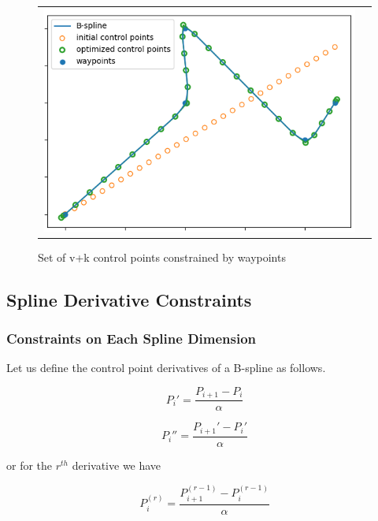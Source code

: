 \documentclass{article}
\begin{document}
\begin{figure}[h]
\begin{tabular}{ll}
\includegraphics[scale=.6]{WaypointConstraintsVariableResolution.png}
\end{tabular}
\caption{Set of v+k control points constrained by waypoints}
\label{Fig:WaypointConstraintsVariableResolution}
\end{figure}

\subsection{Spline Derivative Constraints}

\subsubsection{Constraints on Each Spline Dimension}

Let us define the control point derivatives of a B-spline as follows.

\begin{equation}
    P_i' = \frac{P_{i+1} - P_{i}}{\alpha}
\end{equation}

\begin{equation}
   P_i''= \frac{P_{i+1}' - P_{i}'}{\alpha}
\end{equation}

or for the \(r^{th}\) derivative we have

\begin{equation}
    P_i^{(r)} = \frac{P_{i+1}^{(r-1)} - P_{i}^{(r-1)}}{\alpha}
\end{equation}
\end{document}
